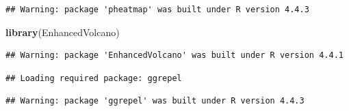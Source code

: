 \documentclass[
]{article}
\newenvironment{Shaded}{\begin{snugshade}}{\end{snugshade}}
\newcommand{\FunctionTok}[1]{\textcolor[rgb]{0.13,0.29,0.53}{\textbf{#1}}}
\newcommand{\NormalTok}[1]{#1}
\begin{document}
\begin{verbatim}
## Warning: package 'pheatmap' was built under R version 4.4.3
\end{verbatim}

\begin{Shaded}
\begin{Highlighting}[]
\FunctionTok{library}\NormalTok{(EnhancedVolcano)}
\end{Highlighting}
\end{Shaded}

\begin{verbatim}
## Warning: package 'EnhancedVolcano' was built under R version 4.4.1
\end{verbatim}

\begin{verbatim}
## Loading required package: ggrepel
\end{verbatim}

\begin{verbatim}
## Warning: package 'ggrepel' was built under R version 4.4.3
\end{verbatim}
\end{document}
